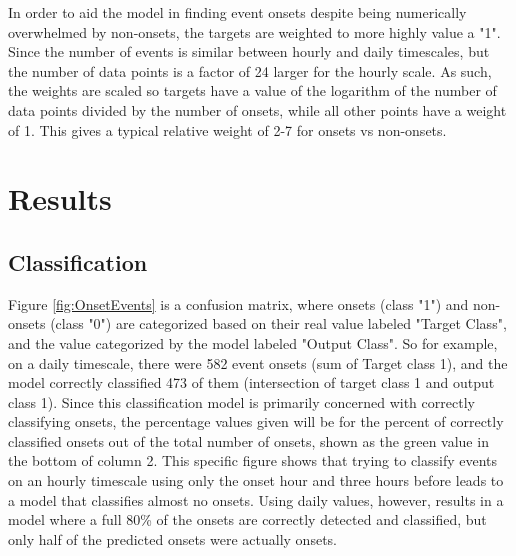 In order to aid the model in finding event onsets despite being numerically overwhelmed by non-onsets, the targets are weighted to more highly value a "1". Since the number of events is similar between hourly and daily timescales, but the number of data points is a factor of 24 larger for the hourly scale. As such, the weights are scaled so targets have a value of the logarithm of the number of data points divided by the number of onsets, while all other points have a weight of 1. This gives a typical relative weight of 2-7 for onsets vs non-onsets. 


\section{Results}

\subsection{Classification}

Figure \ref{fig:OnsetEvents} is a confusion matrix, where onsets (class "1") and non-onsets (class "0") are categorized based on their real value labeled "Target Class", and the value categorized by the model labeled "Output Class". So for example, on a daily timescale, there were 582 event onsets (sum of Target class 1), and the model correctly classified 473 of them (intersection of target class 1 and output class 1). Since this classification model is primarily concerned with correctly classifying onsets, the percentage values given will be for the percent of correctly classified onsets out of the total number of onsets, shown as the green value in the bottom of column 2. This specific figure shows that trying to classify events on an hourly timescale using only the onset hour and three hours before leads to a model that classifies almost no onsets. Using daily values, however, results in a model where a full 80\% of the onsets are correctly detected and classified, but only half of the predicted onsets were actually onsets.

